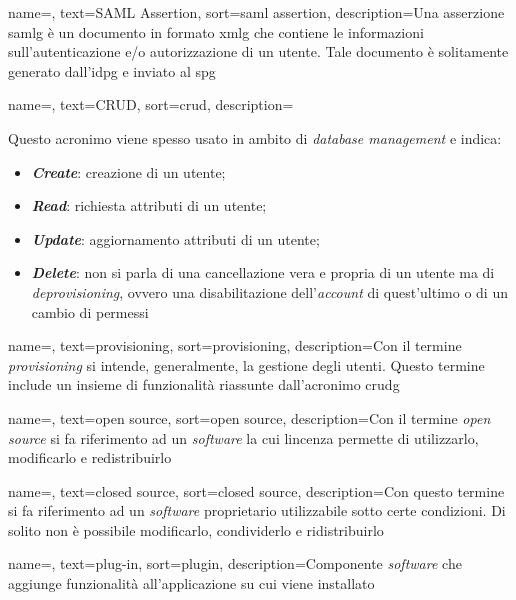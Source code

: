 {
    name=,
    text=SAML Assertion,
    sort=saml assertion,
    description={Una asserzione \gls{samlg} è un documento in formato \gls{xmlg} che contiene le informazioni sull'autenticazione e/o autorizzazione di un utente. Tale documento è solitamente generato dall'\gls{idpg} e inviato al \gls{spg}}
}

{
    name=,
    text=CRUD,
    sort=crud,
    description={Questo acronimo viene spesso usato in ambito di \textit{database management} e indica:
    \begin{itemize}
        \item \textit{\textbf{Create}}: creazione di un utente;
        \item \textit{\textbf{Read}}: richiesta attributi di un utente;
        \item \textit{\textbf{Update}}: aggiornamento attributi di un utente;
        \item \textit{\textbf{Delete}}: non si parla di una cancellazione vera e propria di un utente ma di \textit{deprovisioning}, ovvero una disabilitazione dell'\textit{account} di quest'ultimo o di un cambio di permessi
    \end{itemize}}
}

{
    name=,
    text=provisioning,
    sort=provisioning,
    description={Con il termine \textit{provisioning} si intende, generalmente, la gestione degli utenti. Questo termine include un insieme di funzionalità riassunte dall'acronimo \gls{crudg}}
}

{
    name=,
    text=open source,
    sort=open source,
    description={Con il termine \textit{open source} si fa riferimento ad un \textit{software} la cui lincenza permette di utilizzarlo, modificarlo e redistribuirlo}
}

{
    name=,
    text=closed source,
    sort=closed source,
    description={Con questo termine si fa riferimento ad un \textit{software} proprietario utilizzabile sotto certe condizioni. Di solito non è possibile modificarlo, condividerlo e ridistribuirlo}
}

{
    name=,
    text=plug-in,
    sort=plugin,
    description={Componente \textit{software} che aggiunge funzionalità all'applicazione su cui viene installato}
}

